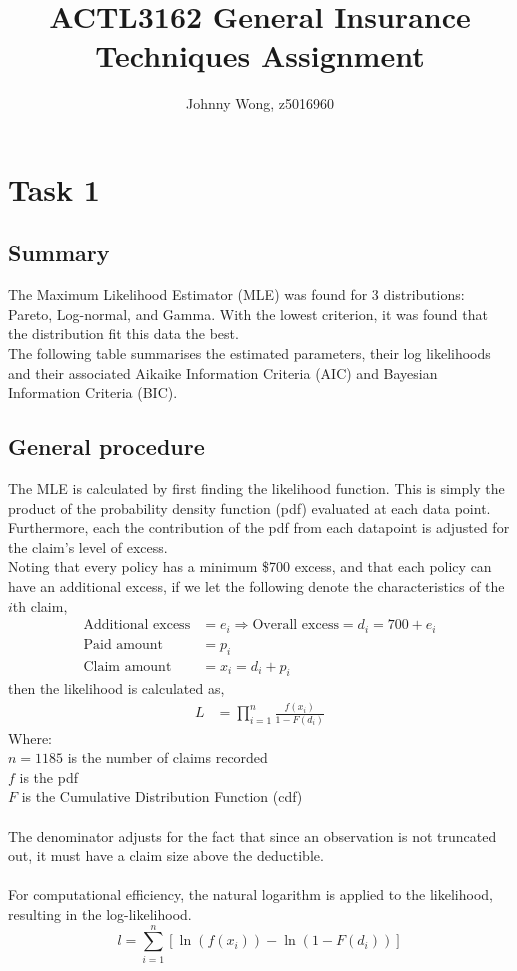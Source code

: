 \documentclass{article}
\title{ACTL3162 General Insurance Techniques Assignment}
\author{Johnny Wong, z5016960}
\begin{document}
	\maketitle
	
	\section{Task 1}
	\subsection{Summary}
	The Maximum Likelihood Estimator (MLE) was found for 3 distributions: Pareto, Log-normal, and Gamma. With the lowest criterion, it was found that the     distribution fit this data the best.\\
	
	The following table summarises the estimated parameters, their log likelihoods and their associated Aikaike Information Criteria (AIC) and Bayesian Information Criteria (BIC).
	
	\subsection{General procedure}
	The MLE is calculated by first finding the likelihood function. This is simply the product of the probability density function (pdf) evaluated at each data point. Furthermore, each the contribution of the pdf from each datapoint is adjusted for the claim's level of excess. \\
	Noting that every policy has a minimum \$700 excess, and that each policy can have an additional excess, if we let the following denote the characteristics of the $i$th claim,	
	\begin{align*}
		\text{Additional excess} &= e_i \Rightarrow	\text{Overall excess} = d_i = 700 + e_i\\
		\text{Paid amount} &= p_i\\
		\text{Claim amount} &= x_i = d_i + p_i
	\end{align*}
	then the likelihood is calculated as,
	\begin{align*}
		L &= \prod_{i = 1}^{n}\frac{f(x_i)}{1-F(d_i)}
	\end{align*}
	Where:\\
	$n = 1185$ is the number of claims recorded\\
	$f$ is the pdf\\
	$F$ is the Cumulative Distribution Function (cdf)\\
	\\
	The denominator adjusts for the fact that since an observation is not truncated out, it must have a claim size above the deductible.\\
	\\
	For computational efficiency, the natural logarithm is applied to the likelihood, resulting in the log-likelihood.
	\begin{equation}
		l=\sum_{i=1}^{n}\left[\ln(f(x_i)) - \ln(1-F(d_i))\right] \label{loglik}
	\end{equation}
\end{document}
